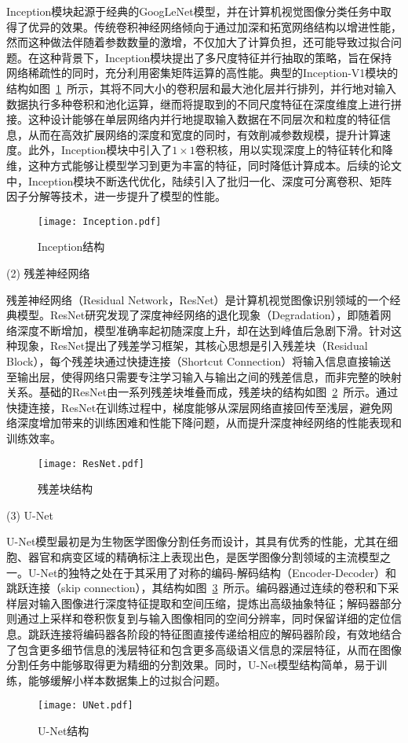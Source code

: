 Inception模块起源于经典的GoogLeNet模型\cite{szegedy2015going}，并在计算机视觉图像分类任务中取得了优异的效果。传统卷积神经网络倾向于通过加深和拓宽网络结构以增进性能，然而这种做法伴随着参数数量的激增，不仅加大了计算负担，还可能导致过拟合问题。在这种背景下，Inception模块提出了多尺度特征并行抽取的策略，旨在保持网络稀疏性的同时，充分利用密集矩阵运算的高性能。典型的Inception-V1模块的结构如图~\ref{fig:Inception}~所示，其将不同大小的卷积层和最大池化层并行排列，并行地对输入数据执行多种卷积和池化运算，继而将提取到的不同尺度特征在深度维度上进行拼接。这种设计能够在单层网络内并行地提取输入数据在不同层次和粒度的特征信息，从而在高效扩展网络的深度和宽度的同时，有效削减参数规模，提升计算速度。此外，Inception模块中引入了\(1\times1\)卷积核，用以实现深度上的特征转化和降维，这种方式能够让模型学习到更为丰富的特征，同时降低计算成本。后续的论文中，Inception模块不断迭代优化，陆续引入了批归一化、深度可分离卷积、矩阵因子分解等技术，进一步提升了模型的性能\cite{szegedy2016rethinking}\cite{szegedy2017inception}。
\begin{figure}
  \centering
  \texttt{[image: Inception.pdf]}
  \caption{Inception结构\cite{szegedy2015going}}
  \label{fig:Inception}
\end{figure}

(2) 残差神经网络

残差神经网络（Residual Network，ResNet）\cite{he2016deep}是计算机视觉图像识别领域的一个经典模型。ResNet研究发现了深度神经网络的退化现象（Degradation），即随着网络深度不断增加，模型准确率起初随深度上升，却在达到峰值后急剧下滑。针对这种现象，ResNet提出了残差学习框架，其核心思想是引入残差块（Residual Block），每个残差块通过快捷连接（Shortcut Connection）将输入信息直接输送至输出层，使得网络只需要专注学习输入与输出之间的残差信息，而非完整的映射关系。基础的ResNet由一系列残差块堆叠而成，残差块的结构如图~\ref{fig:ResNet}~所示。通过快捷连接，ResNet在训练过程中，梯度能够从深层网络直接回传至浅层，避免网络深度增加带来的训练困难和性能下降问题，从而提升深度神经网络的性能表现和训练效率。
\begin{figure}
  \centering
  \texttt{[image: ResNet.pdf]}
  \caption{残差块结构\cite{he2016deep}}
  \label{fig:ResNet}
\end{figure}

(3) U-Net

U-Net模型\cite{ronneberger2015u}最初是为生物医学图像分割任务而设计，其具有优秀的性能，尤其在细胞、器官和病变区域的精确标注上表现出色，是医学图像分割领域的主流模型之一。U-Net的独特之处在于其采用了对称的编码-解码结构（Encoder-Decoder）和跳跃连接（skip connection），其结构如图~\ref{fig:UNet}~所示。编码器通过连续的卷积和下采样层对输入图像进行深度特征提取和空间压缩，提炼出高级抽象特征；解码器部分则通过上采样和卷积恢复到与输入图像相同的空间分辨率，同时保留详细的定位信息。跳跃连接将编码器各阶段的特征图直接传递给相应的解码器阶段，有效地结合了包含更多细节信息的浅层特征和包含更多高级语义信息的深层特征，从而在图像分割任务中能够取得更为精细的分割效果。同时，U-Net模型结构简单，易于训练，能够缓解小样本数据集上的过拟合问题。
\begin{figure}
  \centering
  \texttt{[image: UNet.pdf]}
  \caption{U-Net结构\cite{ronneberger2015u}}
  \label{fig:UNet}
\end{figure}

